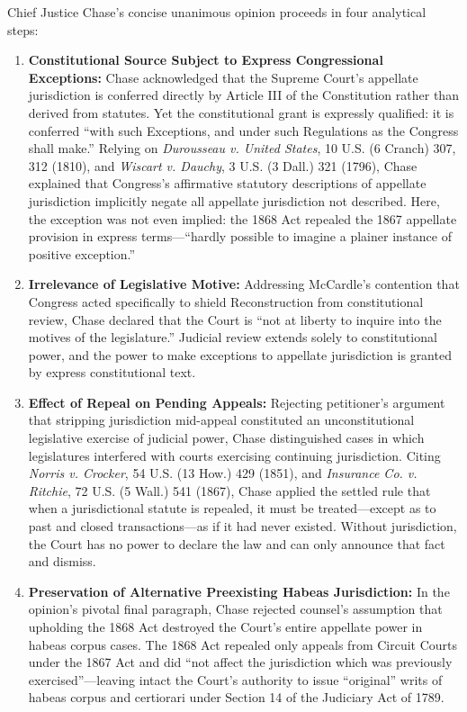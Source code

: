 \documentclass[12pt]{article}
\begin{document}
Chief Justice Chase's concise unanimous opinion proceeds in four analytical steps:
\begin{enumerate}
  \item \textbf{Constitutional Source Subject to Express Congressional Exceptions:} Chase acknowledged that the Supreme Court's appellate jurisdiction is conferred directly by Article III of the Constitution rather than derived from statutes. Yet the constitutional grant is expressly qualified: it is conferred ``with such Exceptions, and under such Regulations as the Congress shall make.'' Relying on \textit{Durousseau v. United States}, 10 U.S. (6 Cranch) 307, 312 (1810), and \textit{Wiscart v. Dauchy}, 3 U.S. (3 Dall.) 321 (1796), Chase explained that Congress's affirmative statutory descriptions of appellate jurisdiction implicitly negate all appellate jurisdiction not described. Here, the exception was not even implied: the 1868 Act repealed the 1867 appellate provision in express terms---``hardly possible to imagine a plainer instance of positive exception.''
  \item \textbf{Irrelevance of Legislative Motive:} Addressing McCardle's contention that Congress acted specifically to shield Reconstruction from constitutional review, Chase declared that the Court is ``not at liberty to inquire into the motives of the legislature.'' Judicial review extends solely to constitutional power, and the power to make exceptions to appellate jurisdiction is granted by express constitutional text.
  \item \textbf{Effect of Repeal on Pending Appeals:} Rejecting petitioner's argument that stripping jurisdiction mid-appeal constituted an unconstitutional legislative exercise of judicial power, Chase distinguished cases in which legislatures interfered with courts exercising continuing jurisdiction. Citing \textit{Norris v. Crocker}, 54 U.S. (13 How.) 429 (1851), and \textit{Insurance Co. v. Ritchie}, 72 U.S. (5 Wall.) 541 (1867), Chase applied the settled rule that when a jurisdictional statute is repealed, it must be treated---except as to past and closed transactions---as if it had never existed. Without jurisdiction, the Court has no power to declare the law and can only announce that fact and dismiss.
  \item \textbf{Preservation of Alternative Preexisting Habeas Jurisdiction:} In the opinion's pivotal final paragraph, Chase rejected counsel's assumption that upholding the 1868 Act destroyed the Court's entire appellate power in habeas corpus cases. The 1868 Act repealed only appeals from Circuit Courts under the 1867 Act and did ``not affect the jurisdiction which was previously exercised''---leaving intact the Court's authority to issue ``original'' writs of habeas corpus and certiorari under Section 14 of the Judiciary Act of 1789.
\end{enumerate}
\end{document}
